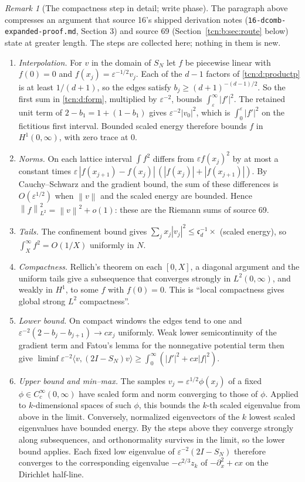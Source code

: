 \documentclass[11pt,letterpaper]{article}
\newcommand{\norm}[1]{\left\lVert#1\right\rVert}
\newcommand{\ip}[2]{\langle#1,#2\rangle}
\newcommand{\eps}{\varepsilon}
\theoremstyle{remark}
\newtheorem{remark}[theorem]{Remark}
\begin{document}
\begin{remark}[The compactness step in detail; write phase]\label{tcn:d:rem:compact}
The paragraph above compresses an argument that source 16's shipped derivation notes (\textup{\nolinkurl{16-dcomb-expanded-proof.md}}, Section 3) and source 69 (Section~\ref{tcn:b:sec:route} below) state at greater length. The steps are collected here; nothing in them is new.
\begin{enumerate}[itemsep=2pt]
\item \emph{Interpolation.} For $v$ in the domain of $S_N$ let $f$ be piecewise linear with $f(0)=0$ and $f(x_j)=\eps^{-1/2}v_j$. Each of the $d-1$ factors of \eqref{tcn:d:productp} is at least $1/(d+1)$, so the edges satisfy $b_j\ge(d+1)^{-(d-1)/2}$. So the first sum in \eqref{tcn:d:form}, multiplied by $\eps^{-2}$, bounds $\int_\eps^\infty|f'|^2$. The retained unit term of $2-b_1=1+(1-b_1)$ gives $\eps^{-2}|v_0|^2$, which is $\int_0^\eps|f'|^2$ on the fictitious first interval. Bounded scaled energy therefore bounds $f$ in $H^1(0,\infty)$, with zero trace at $0$.
\item \emph{Norms.} On each lattice interval $\int f^2$ differs from $\eps f(x_j)^2$ by at most a constant times $\eps\,|f(x_{j+1})-f(x_j)|\,(|f(x_j)|+|f(x_{j+1})|)$. By Cauchy--Schwarz and the gradient bound, the sum of these differences is $O(\eps^{1/2})$ when $\norm v$ and the scaled energy are bounded. Hence $\norm f_{L^2}^2=\norm v^2+o(1)$: these are the Riemann sums of source 69.
\item \emph{Tails.} The confinement bound gives $\sum_jx_j|v_j|^2\le\mathfrak c_d^{-1}\times$ (scaled energy), so $\int_X^\infty f^2=O(1/X)$ uniformly in $N$.
\item \emph{Compactness.} Rellich's theorem on each $[0,X]$, a diagonal argument and the uniform tails give a subsequence that converges strongly in $L^2(0,\infty)$, and weakly in $H^1$, to some $f$ with $f(0)=0$. This is ``local compactness gives global strong $L^2$ compactness''.
\item \emph{Lower bound.} On compact windows the edges tend to one and $\eps^{-2}(2-b_j-b_{j+1})\to cx_j$ uniformly. Weak lower semicontinuity of the gradient term and Fatou's lemma for the nonnegative potential term then give $\liminf\eps^{-2}\ip v{(2I-S_N)v}\ge\int_0^\infty(|f'|^2+cx|f|^2)$.
\item \emph{Upper bound and min--max.} The samples $v_j=\eps^{1/2}\phi(x_j)$ of a fixed $\phi\in C_c^\infty(0,\infty)$ have scaled form and norm converging to those of $\phi$. Applied to $k$-dimensional spaces of such $\phi$, this bounds the $k$-th scaled eigenvalue from above in the limit. Conversely, normalized eigenvectors of the $k$ lowest scaled eigenvalues have bounded energy. By the steps above they converge strongly along subsequences, and orthonormality survives in the limit, so the lower bound applies. Each fixed low eigenvalue of $\eps^{-2}(2I-S_N)$ therefore converges to the corresponding eigenvalue $-c^{2/3}z_k$ of $-\partial_x^2+cx$ on the Dirichlet half-line.
\end{enumerate}
\end{remark}
\end{document}
